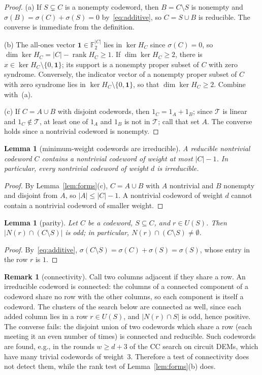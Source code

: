 \documentclass[11pt]{article}
\newtheorem{lemma}[theorem]{Lemma}
\theoremstyle{definition}
\newtheorem{remark}[theorem]{Remark}
\newcommand{\Ftwo}{\mathbb{F}_2}
\DeclareMathOperator{\rank}{rank}
\newcommand{\Tr}{\mathcal{T}}   %
\begin{document}
\begin{proof}
(a) If $S\subsetneq C$ is a nonempty codeword, then $B=C\setminus S$ is nonempty and $\sigma(B)=\sigma(C)+\sigma(S)=0$
by~\eqref{eq:additive}, so $C=S\cup B$ is reducible. The converse is immediate from the definition.

(b) The all-ones vector $\mathbf{1}\in\Ftwo^{|C|}$ lies in $\ker H_C$ since $\sigma(C)=0$, so
$\dim\ker H_C=|C|-\rank H_C\ge1$. If $\dim\ker H_C\ge2$, there is $x\in\ker H_C\setminus\{0,\mathbf{1}\}$; its support
is a nonempty proper subset of $C$ with zero syndrome. Conversely, the indicator vector of a nonempty proper subset of
$C$ with zero syndrome lies in $\ker H_C\setminus\{0,\mathbf{1}\}$, so that $\dim\ker H_C\ge2$. Combine with~(a).

(c) If $C=A\cup B$ with disjoint codewords, then $1_C=1_A+1_B$; since $\Tr$ is linear and $1_C\notin\Tr$, at least one
of $1_A$ and $1_B$ is not in $\Tr$; call that set $A$. The converse holds since a nontrivial codeword is nonempty.
\end{proof}

\begin{lemma}[minimum-weight codewords are irreducible]\label{lem:minweight}
A reducible nontrivial codeword $C$ contains a nontrivial codeword of weight at most $|C|-1$. In particular, every
nontrivial codeword of weight $d$ is irreducible.
\end{lemma}

\begin{proof}
By Lemma~\ref{lem:forms}(c), $C=A\cup B$ with $A$ nontrivial and $B$ nonempty and disjoint from $A$, so
$|A|\le|C|-1$. A nontrivial codeword of weight $d$ cannot contain a nontrivial codeword of smaller weight.
\end{proof}

\begin{lemma}[parity]\label{lem:parity}
Let $C$ be a codeword, $S\subseteq C$, and $r\in U(S)$. Then $|N(r)\cap(C\setminus S)|$ is odd; in particular,
$N(r)\cap(C\setminus S)\neq\emptyset$.
\end{lemma}

\begin{proof}
By~\eqref{eq:additive}, $\sigma(C\setminus S)=\sigma(C)+\sigma(S)=\sigma(S)$, whose entry in the row $r$ is $1$.
\end{proof}

\begin{remark}[connectivity]\label{rem:connected}
Call two columns adjacent if they share a row. An irreducible codeword is connected: the columns of a connected
component of a codeword share no row with the other columns, so each component is itself a codeword. The clusters of
the search below are connected as well, since each added column lies in a row $r\in U(S)$, and $|N(r)\cap S|$ is odd,
hence positive. The converse fails: the disjoint union of two codewords which share a row (each meeting it an even
number of times) is connected and reducible. Such codewords are found, e.g., in the rounds $w\ge d+3$ of the CC search
on circuit DEMs, which have many trivial codewords of weight~3. Therefore a test of connectivity does not detect them,
while the rank test of Lemma~\ref{lem:forms}(b) does.
\end{remark}
\end{document}
